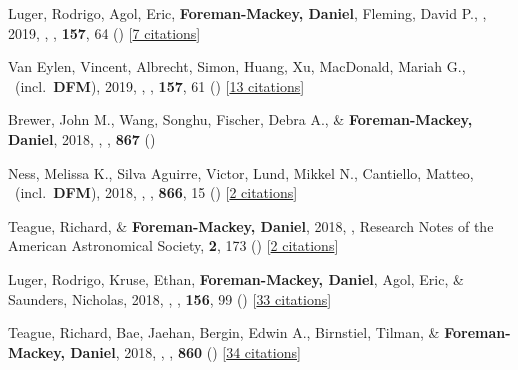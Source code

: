 \item[{\color{numcolor}\scriptsize41}] Luger, Rodrigo, Agol, Eric, \textbf{Foreman-Mackey, Daniel}, Fleming, David P., \etal, 2019, , \aj, \textbf{157}, 64 () [\href{http://adsabs.harvard.edu/abs/2019AJ....157...64L}{7 citations}]

\item[{\color{numcolor}\scriptsize40}] Van Eylen, Vincent, Albrecht, Simon, Huang, Xu, MacDonald, Mariah G., \etal\ (incl.\ \textbf{DFM}), 2019, , \aj, \textbf{157}, 61 () [\href{http://adsabs.harvard.edu/abs/2019AJ....157...61V}{13 citations}]

\item[{\color{numcolor}\scriptsize39}] Brewer, John M., Wang, Songhu, Fischer, Debra A., \& \textbf{Foreman-Mackey, Daniel}, 2018, , \apj, \textbf{867} ()

\item[{\color{numcolor}\scriptsize38}] Ness, Melissa K., Silva Aguirre, Victor, Lund, Mikkel N., Cantiello, Matteo, \etal\ (incl.\ \textbf{DFM}), 2018, , \apj, \textbf{866}, 15 () [\href{http://adsabs.harvard.edu/abs/2018ApJ...866...15N}{2 citations}]

\item[{\color{numcolor}\scriptsize37}] Teague, Richard, \& \textbf{Foreman-Mackey, Daniel}, 2018, , Research Notes of the American Astronomical Society, \textbf{2}, 173 () [\href{http://adsabs.harvard.edu/abs/2018RNAAS...2c.173T}{2 citations}]

\item[{\color{numcolor}\scriptsize36}] Luger, Rodrigo, Kruse, Ethan, \textbf{Foreman-Mackey, Daniel}, Agol, Eric, \& Saunders, Nicholas, 2018, , \aj, \textbf{156}, 99 () [\href{http://adsabs.harvard.edu/abs/2018AJ....156...99L}{33 citations}]

\item[{\color{numcolor}\scriptsize35}] Teague, Richard, Bae, Jaehan, Bergin, Edwin A., Birnstiel, Tilman, \& \textbf{Foreman-Mackey, Daniel}, 2018, , \apj, \textbf{860} () [\href{http://adsabs.harvard.edu/abs/2018ApJ...860L..12T}{34 citations}]

